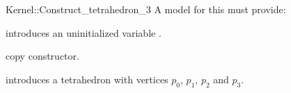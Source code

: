 \begin{ccRefFunctionObjectConcept}{Kernel::Construct_tetrahedron_3}
A model for this must provide:



\ccHidden {}
             {introduces an uninitialized variable .}

\ccHidden {}
 	    {copy constructor.}


            {introduces a tetrahedron  with vertices $p_0$, $p_1$, $p_2$ and $p_3$.}

\end{ccRefFunctionObjectConcept}
